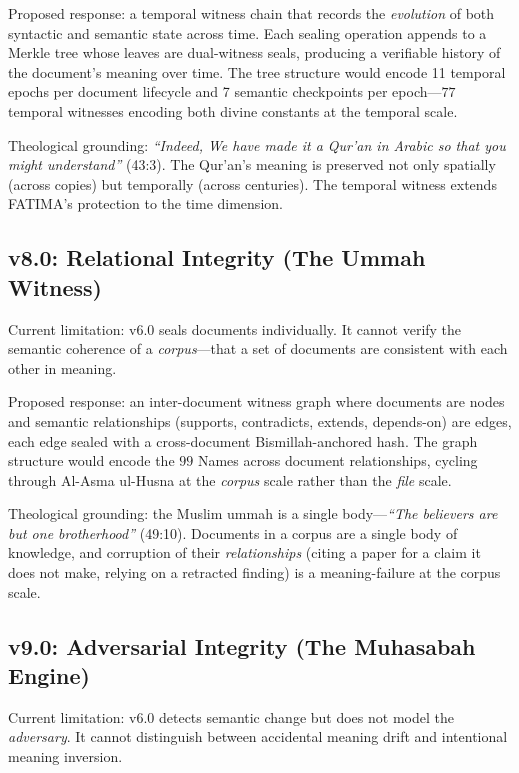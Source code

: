 \documentclass[11pt,a4paper]{article}
\begin{document}
Proposed response: a temporal witness chain that records the \textit{evolution} of both syntactic and semantic state across time. Each sealing operation appends to a Merkle tree whose leaves are dual-witness seals, producing a verifiable history of the document's meaning over time. The tree structure would encode 11 temporal epochs per document lifecycle and 7 semantic checkpoints per epoch---$77$ temporal witnesses encoding both divine constants at the temporal scale.

Theological grounding: \textit{``Indeed, We have made it a Qur'an in Arabic so that you might understand''} (43:3). The Qur'an's meaning is preserved not only spatially (across copies) but temporally (across centuries). The temporal witness extends FATIMA's protection to the time dimension.

\subsection{v8.0: Relational Integrity (The Ummah Witness)}

Current limitation: v6.0 seals documents individually. It cannot verify the semantic coherence of a \textit{corpus}---that a set of documents are consistent with each other in meaning.

Proposed response: an inter-document witness graph where documents are nodes and semantic relationships (supports, contradicts, extends, depends-on) are edges, each edge sealed with a cross-document Bismillah-anchored hash. The graph structure would encode the $99$ Names across document relationships, cycling through Al-Asma ul-Husna at the \textit{corpus} scale rather than the \textit{file} scale.

Theological grounding: the Muslim ummah is a single body---\textit{``The believers are but one brotherhood''} (49:10). Documents in a corpus are a single body of knowledge, and corruption of their \textit{relationships} (citing a paper for a claim it does not make, relying on a retracted finding) is a meaning-failure at the corpus scale.

\subsection{v9.0: Adversarial Integrity (The Muhasabah Engine)}

Current limitation: v6.0 detects semantic change but does not model the \textit{adversary}. It cannot distinguish between accidental meaning drift and intentional meaning inversion.
\end{document}
